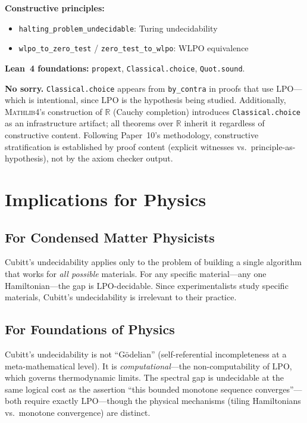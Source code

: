 \documentclass[11pt,a4paper]{article}
\theoremstyle{plain}
\theoremstyle{definition}
\newcommand{\RR}{\mathbb{R}}
\newcommand{\LPO}{\ensuremath{\mathrm{LPO}}}
\newcommand{\WLPO}{\ensuremath{\mathrm{WLPO}}}
\newcommand{\Mathlib}{\textsc{Mathlib4}}
\begin{document}
\noindent
\textbf{Constructive principles:}
\begin{itemize}[nosep]
  \item \texttt{halting\_problem\_undecidable}: Turing undecidability
  \item \texttt{wlpo\_to\_zero\_test} / \texttt{zero\_test\_to\_wlpo}: $\WLPO$ equivalence
\end{itemize}

\noindent
\textbf{Lean~4 foundations:}
\texttt{propext}, \texttt{Classical.choice}, \texttt{Quot.sound}.

\medskip\noindent
\textbf{No sorry.} \texttt{Classical.choice} appears from
\texttt{by\_contra} in proofs that use $\LPO$---which is intentional,
since $\LPO$ is the hypothesis being studied. Additionally,
\Mathlib{}'s construction of $\RR$ (Cauchy completion) introduces
\texttt{Classical.choice} as an infrastructure artifact; all theorems
over $\RR$ inherit it regardless of constructive content. Following
Paper~10's methodology, constructive stratification is established
by proof content (explicit witnesses vs.\ principle-as-hypothesis),
not by the axiom checker output.

\section{Implications for Physics}\label{sec:physics}

\subsection{For Condensed Matter Physicists}

Cubitt's undecidability applies only to the problem of building a
single algorithm that works for \emph{all possible} materials.
For any specific material---any one Hamiltonian---the gap is
$\LPO$-decidable. Since experimentalists study specific materials,
Cubitt's undecidability is irrelevant to their practice.

\subsection{For Foundations of Physics}

Cubitt's undecidability is not ``G\"odelian'' (self-referential
incompleteness at a meta-mathematical level). It is
\emph{computational}---the non-computability of $\LPO$, which
governs thermodynamic limits. The spectral gap is undecidable at the same logical cost as
the assertion ``this bounded monotone sequence converges''---both
require exactly $\LPO$---though the physical mechanisms (tiling
Hamiltonians vs.\ monotone convergence) are distinct.
\end{document}
